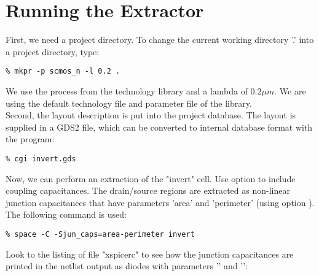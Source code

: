 \section{Running the Extractor}
First, we need a project directory.
To change the current working directory '.' into a project directory, type:
\small
\begin{Verbatim}
% mkpr -p scmos_n -l 0.2 .
\end{Verbatim}
\normalsize
We use the  process from the technology library and a lambda of $0.2 \mu m$.
We are using the default technology
file  and parameter file  of the library.
\\[1 ex]
Second, the layout description is put into the project database.
The layout is supplied in a GDS2 file, which can be converted to
internal database format with the  program:
\small
\begin{Verbatim}
% cgi invert.gds
\end{Verbatim}
\normalsize
Now, we can perform an extraction of the "invert" cell.
Use option  to include coupling capacitances.
The drain/source regions are extracted as non-linear junction capacitances
that have parameters 'area' and 'perimeter' (using option ).
The following command is used:
\small
\begin{Verbatim}
% space -C -Sjun_caps=area-perimeter invert
\end{Verbatim}
\normalsize
Look to the listing of file "xspicerc" to see how the junction capacitances are
printed in the netlist output as diodes with parameters '' and '':

